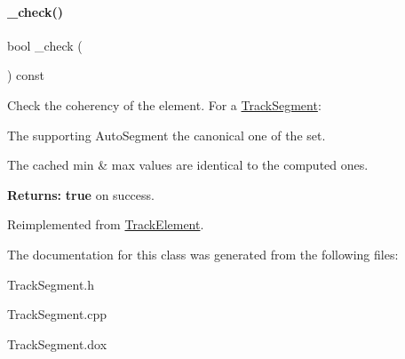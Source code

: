 \paragraph{\texorpdfstring{\+\_\+check()}{\_check()}}
{\footnotesize\ttfamily bool \+\_\+check (\begin{DoxyParamCaption}{ }\end{DoxyParamCaption}) const\hspace{0.3cm}{\ttfamily [virtual]}}

Check the coherency of the element. For a \hyperlink{classKite_1_1TrackSegment}{Track\+Segment}\+:
\begin{DoxyItemize}
\item The supporting Auto\+Segment the canonical one of the set.
\item The cached {\ttfamily min} \& {\ttfamily max} values are identical to the computed ones.
\end{DoxyItemize}

{\bfseries Returns\+:} {\bfseries true} on success. 

Reimplemented from \hyperlink{classKite_1_1TrackElement_ad79f4c6ea0fe1135b8264a29af085909}{Track\+Element}.



The documentation for this class was generated from the following files\+:\begin{DoxyCompactItemize}
\item 
Track\+Segment.\+h\item 
Track\+Segment.\+cpp\item 
Track\+Segment.\+dox\end{DoxyCompactItemize}
